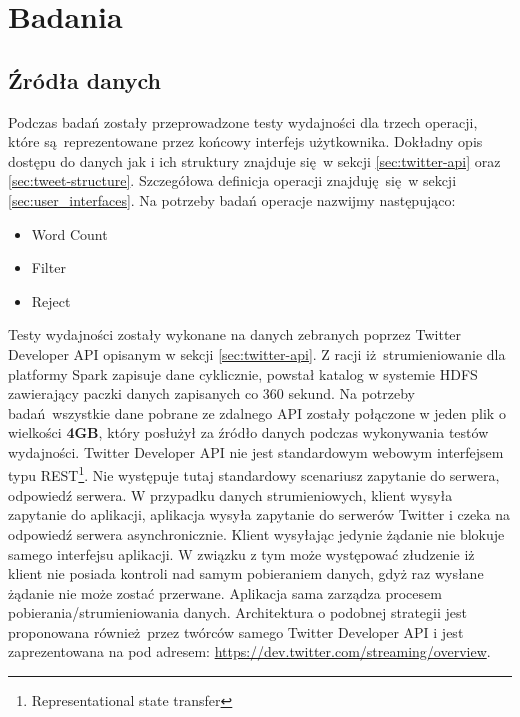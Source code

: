 \chapter{Badania}\label{chap.research}
\section{Źródła danych}
Podczas badań zostały przeprowadzone testy wydajności dla trzech operacji, które są reprezentowane przez końcowy interfejs użytkownika. Dokładny opis dostępu do danych jak i ich struktury znajduje się w sekcji \ref{sec:twitter-api} oraz \ref{sec:tweet-structure}. Szczegółowa definicja operacji znajduję się w sekcji \ref{sec:user_interfaces}. 
Na potrzeby badań operacje nazwijmy następująco:
\begin{itemize}
	\item {Word Count}
	\item {Filter}
	\item {Reject}
\end{itemize}
Testy wydajności zostały wykonane na danych zebranych poprzez Twitter Developer API opisanym w sekcji \ref{sec:twitter-api}. Z racji iż strumieniowanie dla platformy Spark zapisuje dane cyklicznie, powstał katalog w systemie HDFS zawierający paczki danych zapisanych co 360 sekund. Na potrzeby badań wszystkie dane pobrane ze zdalnego API zostały połączone w jeden plik o wielkości \textbf{4GB}, który posłużył za źródło danych podczas wykonywania testów wydajności. Twitter Developer API nie jest standardowym webowym interfejsem typu REST\footnote{Representational state transfer}. Nie występuje tutaj standardowy scenariusz zapytanie do serwera, odpowiedź serwera. W przypadku danych strumieniowych, klient wysyła zapytanie do aplikacji, aplikacja wysyła zapytanie do serwerów Twitter i czeka na odpowiedź serwera asynchronicznie. Klient wysyłając jedynie żądanie nie blokuje samego interfejsu aplikacji. W związku z tym może występować złudzenie iż klient nie posiada kontroli nad samym pobieraniem danych, gdyż raz wysłane żądanie nie może zostać przerwane. Aplikacja sama zarządza procesem pobierania/strumieniowania danych. Architektura o podobnej strategii jest proponowana również przez twórców samego Twitter Developer API i jest zaprezentowana na pod adresem: \url{https://dev.twitter.com/streaming/overview}.

